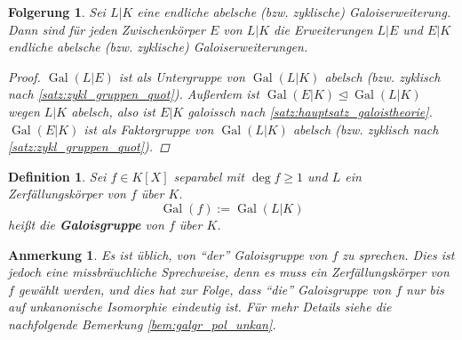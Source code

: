 \documentclass[a4paper, twoside, 11pt, ngerman]{report}
\DeclareMathOperator{\Gal}{Gal}
\theoremstyle{definistyle}
\newtheorem{defini}[satz]{Definition}
\newtheorem{anm}[satz]{Anmerkung}
\newtheorem{folgerung}[satz]{Folgerung}
\theoremstyle{remark}
\newcommand{\defn}[1]{\textit{\bfseries #1}}
\begin{document}
\begin{folgerung}\label{folg:abelsch_zyklisch}
Sei $L|K$ eine endliche abelsche (bzw. zyklische) Galoiserweiterung. Dann sind für jeden Zwischenkörper $E$ von $L|K$ die Erweiterungen $L|E$ und $E|K$ endliche abelsche (bzw. zyklische) Galoiserweiterungen.

\begin{proof}
$\Gal(L|E)$ ist als Untergruppe von $\Gal(L|K)$ abelsch (bzw. zyklisch nach \ref{satz:zykl_gruppen_quot}).  
Außerdem ist $\Gal(E|K) \trianglelefteq\Gal(L|K)$ wegen $L|K$ abelsch, also ist $E|K$ galoissch nach \ref{satz:hauptsatz_galoistheorie}. $\Gal(E|K)$ ist als Faktorgruppe von $\Gal(L|K)$ abelsch (bzw. zyklisch nach \ref{satz:zykl_gruppen_quot}).
\end{proof}
\end{folgerung}

\begin{defini}\label{def:galoisgruppe_polynom}
Sei $f \in K[X]$ separabel mit $\deg f \geq 1$ und $L$ ein Zerfällungskörper von $f$ über $K$.  
\[
\Gal(f) := \Gal(L|K)
\]
heißt die \defn{Galoisgruppe} von $f$ über $K$.
\end{defini}

\begin{anm}\label{anm:galgr_pol_unkan}
Es ist üblich, von "`der"' Galoisgruppe von $f$ zu sprechen. Dies ist jedoch eine missbräuchliche Sprechweise,
denn es muss ein Zerfällungskörper von $f$ gewählt werden, und dies hat zur Folge, dass "`die"' Galoisgruppe von
$f$ nur bis auf unkanonische Isomorphie eindeutig ist. Für mehr Details siehe die nachfolgende Bemerkung \ref{bem:galgr_pol_unkan}.
\end{anm}
\end{document}

